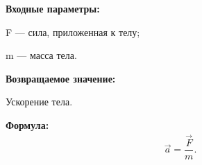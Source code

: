 \textbf{Входные параметры:}  
 
F --- сила, приложенная к телу;

 m --- масса тела.

\textbf{Возвращаемое значение:}

 Ускорение тела.
 
\textbf{Формула:}
\begin{eqnarray*}
\vec{a}=\dfrac{\vec{F}}{m}.
\end{eqnarray*}